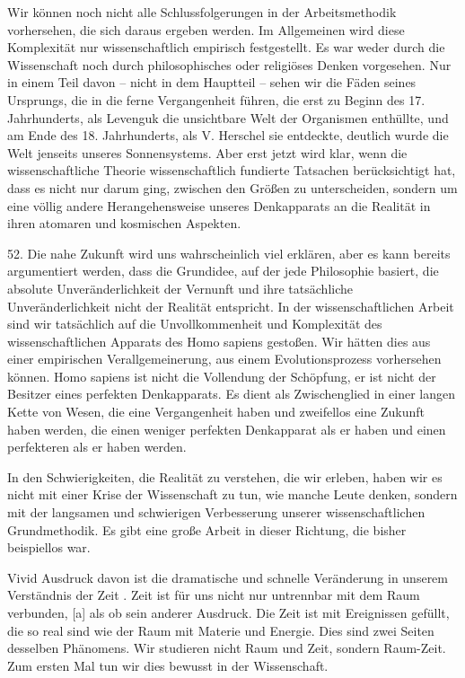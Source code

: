 \documentclass[11pt,a4paper]{book}
\begin{document}
Wir können noch nicht alle Schlussfolgerungen in der Arbeitsmethodik vorhersehen, die sich daraus ergeben werden. Im Allgemeinen wird diese Komplexität nur wissenschaftlich empirisch festgestellt. Es war weder durch die Wissenschaft noch durch philosophisches oder religiöses Denken vorgesehen. Nur in einem Teil davon -- nicht in dem Hauptteil -- sehen wir die Fäden seines Ursprungs, die in die ferne Vergangenheit führen, die erst zu Beginn des 17. Jahrhunderts, als Levenguk die unsichtbare Welt der Organismen enthüllte, und am Ende des 18. Jahrhunderts, als V. Herschel sie entdeckte, deutlich wurde die Welt jenseits unseres Sonnensystems. Aber erst jetzt wird klar, wenn die wissenschaftliche Theorie wissenschaftlich fundierte Tatsachen berücksichtigt hat, dass es nicht nur darum ging, zwischen den Größen zu unterscheiden, sondern um eine völlig andere Herangehensweise unseres Denkapparats an die Realität in ihren atomaren und kosmischen Aspekten.



52. Die nahe Zukunft wird uns wahrscheinlich viel erklären, aber es kann bereits argumentiert werden, dass die Grundidee, auf der jede Philosophie basiert, die absolute Unveränderlichkeit der Vernunft und ihre tatsächliche Unveränderlichkeit nicht der Realität entspricht. In der wissenschaftlichen Arbeit sind wir tatsächlich auf die Unvollkommenheit und Komplexität des wissenschaftlichen Apparats des Homo sapiens gestoßen. Wir hätten dies aus einer empirischen Verallgemeinerung, aus einem Evolutionsprozess vorhersehen können. Homo sapiens ist nicht die Vollendung der Schöpfung, er ist nicht der Besitzer eines perfekten Denkapparats. Es dient als Zwischenglied in einer langen Kette von Wesen, die eine Vergangenheit haben und zweifellos eine Zukunft haben werden, die einen weniger perfekten Denkapparat als er haben und einen perfekteren als er haben werden.



In den Schwierigkeiten, die Realität zu verstehen, die wir erleben, haben wir es nicht mit einer Krise der Wissenschaft zu tun, wie manche Leute denken, sondern mit der langsamen und schwierigen Verbesserung unserer wissenschaftlichen Grundmethodik. Es gibt eine große Arbeit in dieser Richtung, die bisher beispiellos war.



Vivid Ausdruck davon ist die dramatische und schnelle Veränderung in unserem Verständnis der Zeit . Zeit ist für uns nicht nur untrennbar mit dem Raum verbunden, [a] als ob sein anderer Ausdruck. Die Zeit ist mit Ereignissen gefüllt, die so real sind wie der Raum mit Materie und Energie. Dies sind zwei Seiten desselben Phänomens. Wir studieren nicht Raum und Zeit, sondern Raum-Zeit. Zum ersten Mal tun wir dies bewusst in der Wissenschaft.
\end{document}
